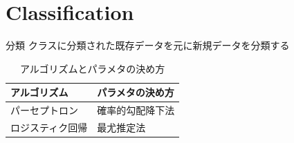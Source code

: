\documentclass[dvipdfmx,platex]{beamer}
\begin{document}
\section{Classification}
\begin{frame}{分類}
  クラスに分類された既存データを元に新規データを分類する
  \begin{table}
    \caption{{\mgfamily アルゴリズムとパラメタの決め方}}
    \begin{tabular}{@{} ll @{}}
      \toprule
      アルゴリズム &パラメタの決め方\\
      \midrule
      パーセプトロン & 確率的勾配降下法\\
      ロジスティク回帰 & 最尤推定法\\
      \bottomrule
    \end{tabular}
  \end{table}
\end{frame}
\end{document}

